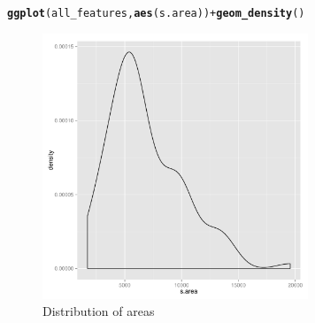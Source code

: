 \documentclass{article}\usepackage[]{graphicx}\usepackage[]{color}
\makeatletter
\newcommand{\hlopt}[1]{\textcolor[rgb]{0,0,0}{#1}}%
\newcommand{\hlstd}[1]{\textcolor[rgb]{0.345,0.345,0.345}{#1}}%
\newcommand{\hlkwd}[1]{\textcolor[rgb]{0.737,0.353,0.396}{\textbf{#1}}}%
\newenvironment{kframe}{%
 \def\at@end@of@kframe{}%
 \ifinner\ifhmode%
  \def\at@end@of@kframe{\end{minipage}}%
  \begin{minipage}{\columnwidth}%
 \fi\fi%
 \def\FrameCommand##1{\hskip\@totalleftmargin \hskip-\fboxsep
 \colorbox{shadecolor}{##1}\hskip-\fboxsep
     \hskip-\linewidth \hskip-\@totalleftmargin \hskip\columnwidth}%
 \MakeFramed {\advance\hsize-\width
   \@totalleftmargin\z@ \linewidth\hsize
   \@setminipage}}%
 {\par\unskip\endMakeFramed%
 \at@end@of@kframe}
\newenvironment{knitrout}{}{} %
\makeatother
\begin{document}
\begin{knitrout}
\color{fgcolor}\begin{kframe}
\begin{alltt}
\hlkwd{ggplot}\hlstd{(all_features,} \hlkwd{aes}\hlstd{(s.area))} \hlopt{+} \hlkwd{geom_density}\hlstd{()}
\end{alltt}
\end{kframe}\begin{figure}

{\centering \includegraphics[width=300px]{knit_figure/figarea-1} 

}

\caption[Distribution of areas]{Distribution of areas\label{fig:area}}
\end{figure}


\end{knitrout}
\end{document}
